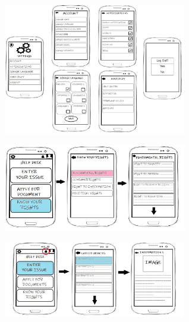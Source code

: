 \documentclass[acmtog]{acmart}
\begin{document}
\begin{figure}[H]
    \includegraphics[width=8cm]{Prototype/Low-fi/LowFi6.jpeg}
\end{figure}
\begin{figure}[H]
    \includegraphics[width=8cm]{Prototype/Low-fi/LowFi7.jpeg}
\end{figure}
\begin{figure}[H]
    \includegraphics[width=8cm]{Prototype/Low-fi/LowFi8.jpeg}
\end{figure}

\clearpage
\end{document}
